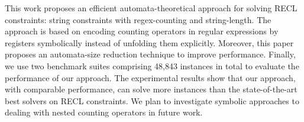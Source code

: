 %

This work proposes an efficient automata-theoretical approach for solving RECL constraints: string constraints with regex-counting and string-length. The approach is based on encoding counting operators in regular expressions by registers symbolically instead of unfolding them explicitly. Moreover, this paper proposes an automata-size reduction technique to improve performance. Finally, we use two benchmark suites comprising 48,843 instances in total to evaluate the performance of our approach. The experimental results show that our approach, with comparable performance, can solve more instances than the state-of-the-art best solvers on RECL constraints. We plan to investigate symbolic approaches to dealing with nested counting operators in future work. 




%